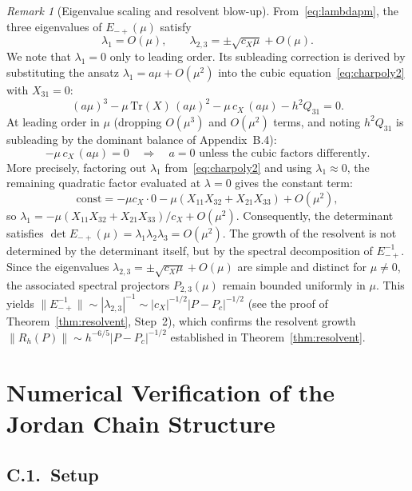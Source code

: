 \documentclass[12pt,a4paper]{amsart}
\theoremstyle{remark}
\newtheorem{remark}[theorem]{Remark}
\begin{document}
\begin{remark}[Eigenvalue scaling and resolvent blow-up]
From~\eqref{eq:lambdapm}, the three eigenvalues of $E_{-+}(\mu)$ satisfy
\[
  \lambda_1 = O(\mu), \qquad \lambda_{2,3} = \pm\sqrt{c_X\mu} + O(\mu).
\]
We note that $\lambda_1 = 0$ only to leading order.
Its subleading correction is derived by substituting the ansatz $\lambda_1 = a\mu + O(\mu^2)$
into the cubic equation~\eqref{eq:charpoly2} with $X_{31}=0$:
\[
  (a\mu)^3 - \mu\,\mathrm{Tr}(X)\,(a\mu)^2 - \mu\,c_X\,(a\mu) - h^2 Q_{31} = 0.
\]
At leading order in $\mu$ (dropping $O(\mu^3)$ and $O(\mu^2)$ terms, and noting
$h^2 Q_{31}$ is subleading by the dominant balance of Appendix~B.4):
\[
  -\mu\,c_X\,(a\mu) = 0 \quad\Longrightarrow\quad a = 0 \text{ unless the cubic factors differently.}
\]
More precisely, factoring out $\lambda_1$ from~\eqref{eq:charpoly2} and using
$\lambda_1 \approx 0$, the remaining quadratic factor evaluated at $\lambda = 0$
gives the constant term:
\[
  \mathrm{const} = -\mu c_X \cdot 0 - \mu(X_{11}X_{32} + X_{21}X_{33}) + O(\mu^2),
\]
so $\lambda_1 = -\mu(X_{11}X_{32}+X_{21}X_{33})/c_X + O(\mu^2)$.
Consequently, the determinant satisfies $\det E_{-+}(\mu) = \lambda_1\lambda_2\lambda_3 = O(\mu^2)$.
The growth of the resolvent is not determined by the determinant itself,
but by the spectral decomposition of $E_{-+}^{-1}$.
Since the eigenvalues $\lambda_{2,3} = \pm\sqrt{c_X\mu} + O(\mu)$ are
simple and distinct for $\mu \neq 0$, the associated spectral projectors
$P_{2,3}(\mu)$ remain bounded uniformly in $\mu$.
This yields $\|E_{-+}^{-1}\| \sim |\lambda_{2,3}|^{-1} \sim |c_X|^{-1/2}|P-P_c|^{-1/2}$
(see the proof of Theorem~\ref{thm:resolvent}, Step~2),
which confirms the resolvent growth $\|R_h(P)\| \sim h^{-6/5}|P-P_c|^{-1/2}$ established
in Theorem~\ref{thm:resolvent}.
\end{remark}

\section{Numerical Verification of the Jordan Chain Structure}

\subsection*{C.1.~Setup}
\end{document}
